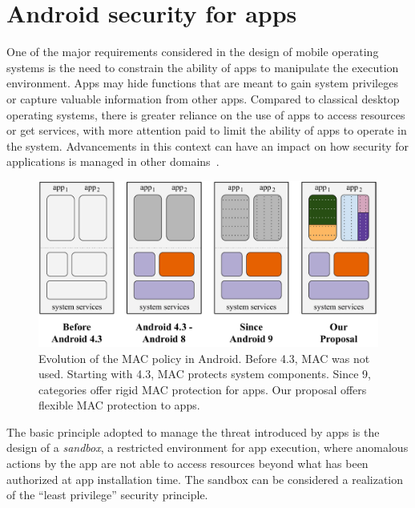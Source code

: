 \section{Android security for apps}\label{sect:seapp_andro_sec}

One of the major requirements considered in the design of mobile
operating systems is the need to constrain the ability of apps to
manipulate the execution environment.  Apps may hide functions that
are meant to gain system privileges or capture valuable information
from other apps.  Compared to classical desktop operating systems,
there is greater reliance on the use of apps to access resources or
get services, with more attention paid to limit the ability of apps to
operate in the system.  Advancements in this context can have an
impact on how security for applications is managed in other
domains~\cite{seapp_sok_android}.

\begin{figure}[t]
	\begin{center}
		\includegraphics[width=\columnwidth]{chapters/seapp/figs/mac-evolution}
	\end{center}
	\caption[Evolution of the MAC policy in Android]{\label{fig:seapp_mac_evolution} Evolution of the MAC policy
          in Android.  Before 4.3, MAC was not used. Starting with 4.3,
          MAC protects system components. Since 9, categories offer
          rigid MAC protection for apps. Our proposal offers flexible
          MAC protection to apps.}
\end{figure}

The basic principle adopted to manage the threat introduced by apps is
the design of a {\em sandbox}, a restricted environment for app
execution, where anomalous actions by the app are not able to access
resources beyond what has been authorized at app installation time.
The sandbox can be considered a realization of the ``least privilege''
security principle.

